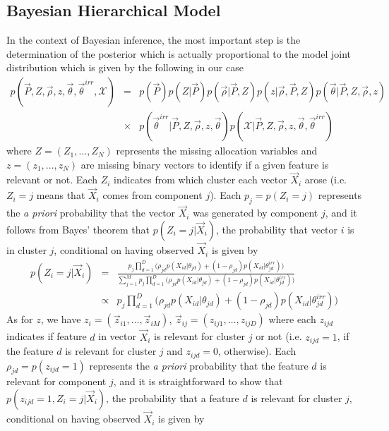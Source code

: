 \documentclass[journal,10pt]{elsart}
\begin{document}
\subsection{Bayesian Hierarchical Model}\label{Bayesian}
In the context of Bayesian inference, the most important step is the determination of the posterior which is actually proportional to the model joint distribution \cite{Ghosh2006,Robert2007} which is given by the following in our case
\begin{eqnarray}
\nonumber p(\vec{P},Z,\vec{\rho},z,\vec{\theta},\vec{\theta}^{irr},\mathcal{X})&=&p(\vec{P})p(Z|\vec{P})p(\vec{\rho}|\vec{P},Z)p(z|\vec{\rho},\vec{P},Z)
p(\vec{\theta}|\vec{P},Z,\vec{\rho},z)\\
&\times&p(\vec{\theta}^{irr}|\vec{P},Z,\vec{\rho},z,\vec{\theta}) p(\mathcal{X}|\vec{P},Z,\vec{\rho},z,\vec{\theta},\vec{\theta}^{irr})
\end{eqnarray}
where $Z=(Z_1,\ldots,Z_N)$ represents the missing allocation variables and $z=(z_1,\ldots,z_N)$ are missing binary vectors to identify if a given feature is relevant or not. Each $Z_i$ indicates from which cluster each vector $\vec{X}_i$ arose (i.e. $Z_i=j$ means that $\vec{X}_i$ comes from component $j$). Each $p_j=p(Z_i=j)$ represents the \emph{a priori} probability that the vector $\vec{X}_i$ was generated by component $j$, and it follows from Bayes' theorem \cite{Ghosh2006,Robert2007} that $p(Z_i=j|\vec{X}_i)$, the probability that vector $i$ is in cluster $j$, conditional on having observed $\vec{X}_i$ is given by
\begin{eqnarray}
\nonumber p(Z_i=j|\vec{X}_i)&=& \frac{p_j \prod_{d=1}^D \big(\rho_{jd} p(X_{id}|\theta_{jd})+(1-\rho_{jd}) p(X_{id}|\theta^{irr}_{jd})\big)}{\sum_{j=1}^Mp_j \prod_{d=1}^D \big(\rho_{jd} p(X_{id}|\theta_{jd})+(1-\rho_{jd}) p(X_{id}|\theta^{irr}_{jd})\big)} \\&\propto& p_j \prod_{d=1}^D \big(\rho_{jd} p(X_{id}|\theta_{jd})+(1-\rho_{jd}) p(X_{id}|\theta^{irr}_{jd})\big)
\end{eqnarray}
As for $z$, we have $z_i=(\vec{z}_{i1},\ldots,\vec{z}_{iM})$, $\vec{z}_{ij}=(z_{ij1},\ldots,z_{ijD})$ where each $z_{ijd}$ indicates if feature $d$ in vector $\vec{X}_i$ is relevant for cluster $j$ or not (i.e. $z_{ijd}=1$, if the feature $d$ is relevant for cluster $j$ and $z_{ijd}=0$, otherwise). Each $\rho_{jd}=p(z_{ijd}=1)$ represents the \emph{a priori} probability that the feature $d$ is relevant for component $j$, and it is straightforward to show that $p(z_{ijd}=1,Z_i=j|\vec{X}_i)$, the probability that a feature $d$ is relevant for cluster $j$, conditional on having observed $\vec{X}_i$ is given by
\end{document}
